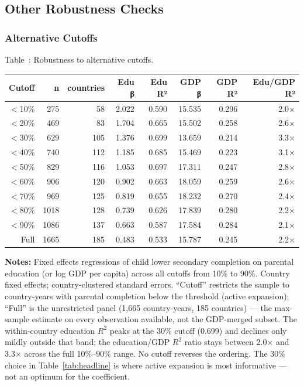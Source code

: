 \documentclass[12pt,letterpaper]{article}
\begin{document}
{\subsection{Other Robustness Checks}\label{appendix-other-robustness}

\subsubsection{Alternative Cutoffs}\label{appendix-cutoffs}

\label{tab:cutoff-full}Table~\thetable: Robustness to alternative cutoffs.

\begin{longtable}[]{@{}rrrrrrrr@{}}
\toprule
Cutoff & n & countries & Edu β & Edu R² & GDP β & GDP R² & Edu/GDP R² \\
\midrule
\endhead
$<$10\% & 275  & 58  & 2.022 & 0.590 & 15.535 & 0.296 & 2.0× \\
$<$20\% & 469  & 83  & 1.704 & 0.665 & 15.502 & 0.258 & 2.6× \\
$<$30\% & 629  & 105 & 1.376 & 0.699 & 13.659 & 0.214 & 3.3× \\
$<$40\% & 740  & 112 & 1.185 & 0.685 & 15.469 & 0.223 & 3.1× \\
$<$50\% & 829  & 116 & 1.053 & 0.697 & 17.311 & 0.247 & 2.8× \\
$<$60\% & 906  & 120 & 0.902 & 0.663 & 18.059 & 0.259 & 2.6× \\
$<$70\% & 969  & 125 & 0.819 & 0.655 & 18.232 & 0.270 & 2.4× \\
$<$80\% & 1018 & 128 & 0.739 & 0.626 & 17.839 & 0.280 & 2.2× \\
$<$90\% & 1086 & 137 & 0.663 & 0.587 & 17.584 & 0.284 & 2.1× \\
Full  & 1665 & 185 & 0.483 & 0.533 & 15.787 & 0.245 & 2.2× \\
\bottomrule
\end{longtable}

\begin{minipage}{\dimexpr\textwidth-2em}
\scriptsize
\textbf{Notes:} Fixed effects regressions of child lower secondary
completion on parental education (or log GDP per capita) across all
cutoffs from 10\% to 90\%. Country fixed effects; country-clustered
standard errors. ``Cutoff'' restricts the sample to country-years
with parental completion below the threshold (active expansion);
``Full'' is the unrestricted panel (1{,}665 country-years, 185
countries) --- the max-sample estimate on every observation available, not
the GDP-merged subset. The within-country education $R^2$ peaks at
the 30\% cutoff (0.699) and declines only mildly outside that band;
the education/GDP $R^2$ ratio stays between 2.0$\times$ and
3.3$\times$ across the full 10\%--90\% range. No cutoff reverses the
ordering. The 30\% choice in Table~\ref{tab:headline} is where active
expansion is most informative --- not an optimum for the
coefficient.
\end{minipage}

}
\end{document}
